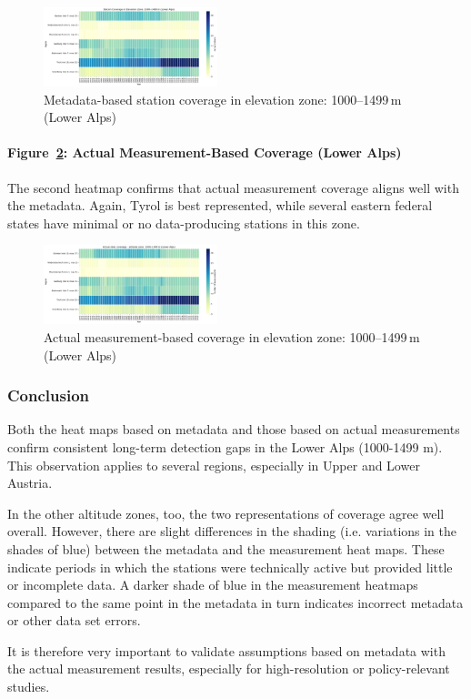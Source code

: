 \begin{figure}[ht]
  \centering
    \includegraphics[width=0.45\textwidth]{img/coverage_zone_loweralps_meta.png}
    \caption{Metadata-based station coverage in elevation zone: 1000--1499\,m (Lower Alps)}
    \label{fig:coverage_meta_loweralps}
\end{figure}

\paragraph{Figure~\ref{fig:coverage_real_loweralps}: Actual Measurement-Based Coverage (Lower Alps)}  
The second heatmap confirms that actual measurement coverage aligns well with the metadata. Again, Tyrol is best represented, while several eastern federal states have minimal or no data-producing stations in this zone.

\begin{figure}[ht]
  \centering
    \includegraphics[width=0.45\textwidth]{img/data_coverage_loweralps.png}
    \caption{Actual measurement-based coverage in elevation zone: 1000--1499\,m (Lower Alps)}
    \label{fig:coverage_real_loweralps}
\end{figure}

\subsubsection{Conclusion}
Both the heat maps based on metadata and those based on actual measurements confirm consistent long-term detection gaps in the Lower Alps (1000-1499 m). This observation applies to several regions, especially in Upper and Lower Austria.

In the other altitude zones, too, the two representations of coverage agree well overall. However, there are slight differences in the shading (i.e. variations in the shades of blue) between the metadata and the measurement heat maps. These indicate periods in which the stations were technically active but provided little or incomplete data. A darker shade of blue in the measurement heatmaps compared to the same point in the metadata in turn indicates incorrect metadata or other data set errors.

It is therefore very important to validate assumptions based on metadata with the actual measurement results, especially for high-resolution or policy-relevant studies.
